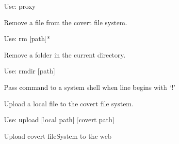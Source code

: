 \documentclass[letterpaper,10pt,english]{sphinxmanual}
\begin{document}
\begin{fulllineitems}
\begin{fulllineitems}
Use: proxy

\end{fulllineitems}


\begin{fulllineitems}
\label{main:main.Console.do_rm}
Remove a file from the covert file system.

Use: rm {[}path{]}*

\end{fulllineitems}


\begin{fulllineitems}
\label{main:main.Console.do_rmdir}
Remove a folder in the current directory.

Use: rmdir {[}path{]}

\end{fulllineitems}


\begin{fulllineitems}
\label{main:main.Console.do_shell}
Pass command to a system shell when line begins with `!'

\end{fulllineitems}


\begin{fulllineitems}
\label{main:main.Console.do_upload}
Upload a local file to the covert file system.

Use: upload {[}local path{]} {[}covert path{]}

\end{fulllineitems}


\begin{fulllineitems}
\label{main:main.Console.do_uploadfs}
Upload covert fileSystem to the web

\end{fulllineitems}



\end{fulllineitems}
\end{document}
